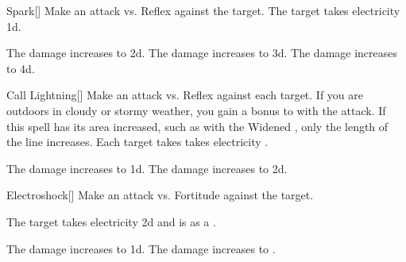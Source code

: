 \lowercase{\hypertarget{spell:Spark}{}}\label{spell:Spark}
\begin{freeability}[Rank 1]{\hypertarget{spell:Spark}{Spark}}[]
Make an attack vs. Reflex against the target.
\hit The target takes electricity  \plus1d.

\rankline
{} The damage increases to  \plus2d.
 The damage increases to  \plus3d.
 The damage increases to  \plus4d.
\end{freeability}
\vspace{0.25em}



\lowercase{\hypertarget{spell:Call Lightning}{}}\label{spell:Call Lightning}
\begin{freeability}[Rank 3]{\hypertarget{spell:Call Lightning}{Call Lightning}}[]
Make an attack vs. Reflex against each target.
If you are outdoors in cloudy or stormy weather, you gain a  bonus to  with the attack.
If this spell has its area increased, such as with the Widened , only the length of the line increases.
\hit Each target takes takes electricity .


\rankline
{} The damage increases to  \plus1d.
 The damage increases to  \plus2d.
\end{freeability}
\vspace{0.25em}



\lowercase{\hypertarget{spell:Electroshock}{}}\label{spell:Electroshock}
\begin{freeability}[Rank 3]{\hypertarget{spell:Electroshock}{Electroshock}}[]
Make an attack vs. Fortitude against the target.

\hit The target takes electricity  \minus2d and is  as a .

\rankline
{} The damage increases to  \minus1d.
 The damage increases to .
\end{freeability}
\vspace{0.25em}



